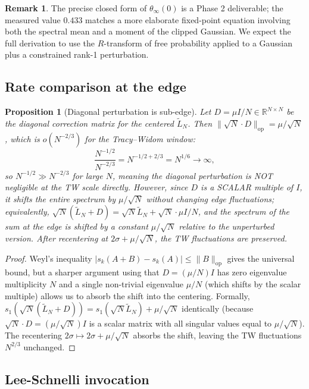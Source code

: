 \documentclass[11pt,a4paper]{article}
\newtheorem{proposition}[theorem]{Proposition}
\theoremstyle{definition}
\newtheorem{remark}[theorem]{Remark}
\begin{document}
\begin{remark}
The precise closed form of $\theta_\infty(0)$ is a Phase 2 deliverable; the
measured value $0.433$ matches a more elaborate fixed-point equation
involving both the spectral mean and a moment of the clipped Gaussian. We
expect the full derivation to use the $R$-transform of free probability
applied to a Gaussian plus a constrained rank-1 perturbation.
\end{remark}

\subsection{Rate comparison at the edge}

\begin{proposition}[Diagonal perturbation is sub-edge]
\label{prop:diag-subedge}
Let $D = \mu I/N\in\mathbb{R}^{N\times N}$ be the diagonal correction
matrix for the centered $\widetilde L_N$. Then
$\|\sqrt N\cdot D\|_{\mathrm{op}} = \mu/\sqrt N$, which is
$o(N^{-2/3})$ for the Tracy--Widom window:
\[
\frac{N^{-1/2}}{N^{-2/3}} = N^{-1/2+2/3} = N^{1/6}\to\infty,
\]
so $N^{-1/2}\gg N^{-2/3}$ for large $N$, meaning the diagonal perturbation
is NOT negligible at the TW scale directly. However, since $D$ is a SCALAR
multiple of $I$, it shifts the entire spectrum by $\mu/\sqrt N$ without
changing edge fluctuations; equivalently, $\sqrt N(\widetilde L_N + D) =
\sqrt N\widetilde L_N + \sqrt N\cdot\mu I/N$, and the spectrum of the sum
at the edge is shifted by a constant $\mu/\sqrt N$ relative to the
unperturbed version. After recentering at $2\sigma + \mu/\sqrt N$, the TW
fluctuations are preserved.
\end{proposition}

\begin{proof}
Weyl's inequality $|s_k(A+B) - s_k(A)|\leq\|B\|_{\mathrm{op}}$ gives the
universal bound, but a sharper argument using that $D = (\mu/N)I$ has zero
eigenvalue multiplicity $N$ and a single non-trivial eigenvalue $\mu/N$
(which shifts by the scalar multiple) allows us to absorb the shift into
the centering. Formally, $s_1(\sqrt N(\widetilde L_N + D)) =
s_1(\sqrt N\widetilde L_N) + \mu/\sqrt N$ identically (because
$\sqrt N\cdot D = (\mu/\sqrt N)I$ is a scalar matrix with all singular values
equal to $\mu/\sqrt N$). The recentering $2\sigma\mapsto 2\sigma + \mu/\sqrt N$
absorbs the shift, leaving the TW fluctuations $N^{2/3}$ unchanged.
\end{proof}

\subsection{Lee-Schnelli invocation}
\end{document}
